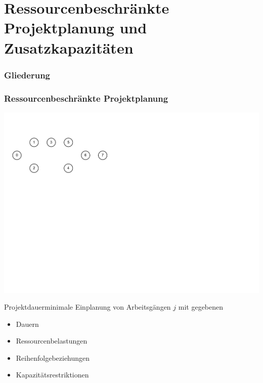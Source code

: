 
\section{Ressourcenbeschränkte Projektplanung und Zusatzkapazitäten}

\begin{frame}[noframenumbering]
\frametitle{Gliederung}
\end{frame}

\begin{frame}[t]
\frametitle{Ressourcenbeschränkte Projektplanung}
\begin{center}
\includegraphics[page=3, width=\textwidth]{images/rcpsp.pdf}\\
\end{center}

{\small
Projektdauerminimale Einplanung von Arbeitsgängen $j$ mit gegebenen
\begin{itemize}
\itemsep0em
\item Dauern
\item Ressourcenbelastungen
\item Reihenfolgebeziehungen
\item Kapazitätsrestriktionen
\end{itemize}
}
\end{frame}


